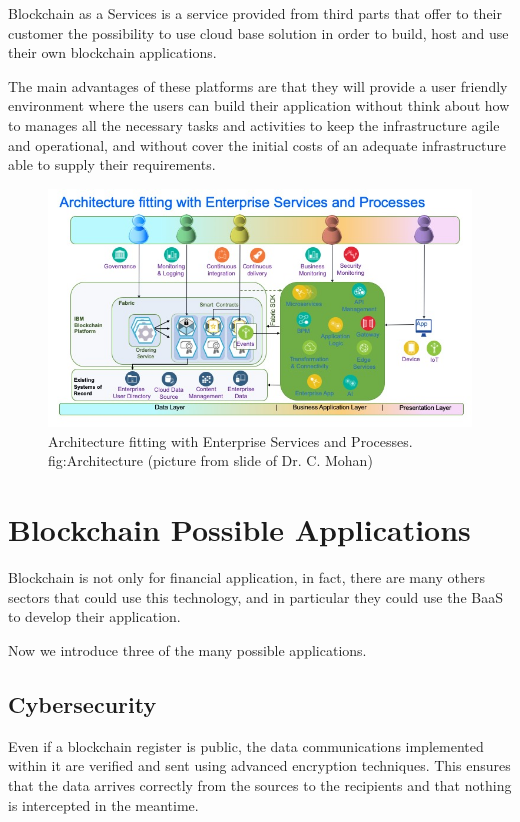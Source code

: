 \documentclass{article}
\begin{document}
    Blockchain as a Services is a service provided from third parts that offer to their customer the possibility to use cloud base solution in order to build, host and use their own blockchain applications.
    
    The main advantages of these platforms are that they will provide a user friendly environment where the users can build their application without think about how to manages all the necessary tasks and activities to keep the infrastructure agile and operational, and without cover the initial costs of an adequate infrastructure able to supply their requirements.
    
    \begin{figure}[h]
        \centering
        \includegraphics[width=0.8\linewidth]{Slide1.jpeg}
        \caption{Architecture fitting with Enterprise Services and Processes. fig:Architecture (picture from slide of Dr. C. Mohan)}
        \label{fig:fig:Architecture}
    \end{figure}
    
\section{Blockchain Possible Applications}
    Blockchain is not only for financial application, in fact, there are many others sectors that could use this technology, and in particular they could use the BaaS to develop their application.
    
    Now we introduce three of the many possible applications.
    \subsection{Cybersecurity}
        Even if a blockchain register is public, the data communications implemented within it are verified and sent using advanced encryption techniques\cite{cybercecurity}.
        This ensures that the data arrives correctly from the sources to the recipients and that nothing is intercepted in the meantime.
        
\end{document}
